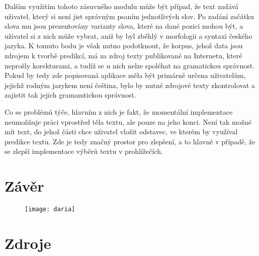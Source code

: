 \documentclass[a4paper,11pt]{article}
\begin{document}
Dalším využitím tohoto zásuvného modulu může být případ, že text zadává uživatel, který si není jist správným psaním jednotlivých slov. Po zadání začátku slova mu jsou prezentovány varianty slova, které na dané pozici mohou být, a uživatel si z nich může vybrat, aniž by byl zběhlý v morfologii a syntaxi českého jazyka. K tomuto bodu je však nutno podotknout, že korpus, jehož data jsou zdrojem k tvorbě predikcí, má za zdroj texty publikované na Internetu, které neprošly korekturami, a tudíž se u nich nelze spoléhat na gramatickou správnost. Pokud by tedy zde popisovaná aplikace měla být primárně určena uživatelům, jejichž rodným jazykem není čeština, bylo by nutné zdrojové texty zkontrolovat a zajistit tak jejich gramamtickou správnost.

Co se problémů týče, hlavním z nich je fakt, že momentální implementace neumožňuje práci vprostřed těla textu, ale pouze na jeho konci. Není tak možné mít text, do jehož části chce uživatel vložit odstavec, ve kterém by využíval predikce textu. Zde je tedy značný prostor pro zlepšení, a to hlavně v případě, že se zlepší implementace výběrů textu v prohlížečích.


\section*{Závěr}

\begin{figure}[h]
	\centering
	\texttt{[image: daria]}
\end{figure}
\section*{Zdroje}




\end{document}
